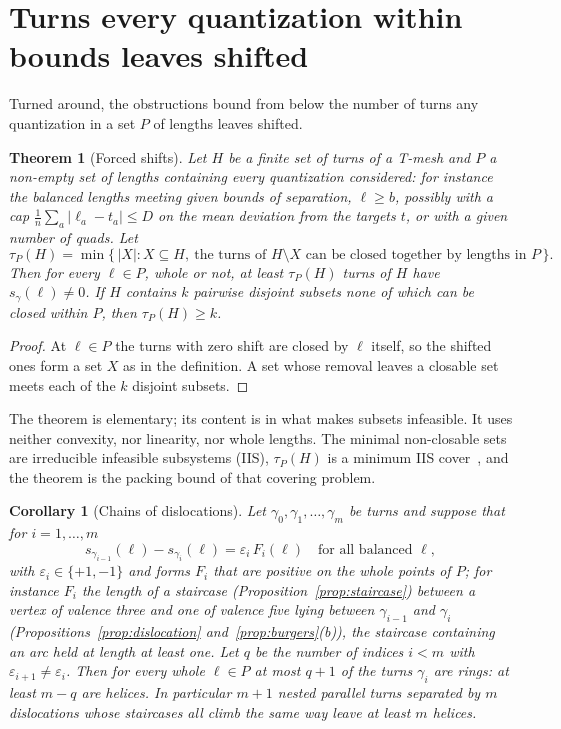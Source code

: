 \documentclass[11pt,a4paper]{article}
\newtheorem{theorem}{Theorem}
\newtheorem{corollary}{Corollary}
\newcommand{\shift}{s}
\begin{document}
\section{Turns every quantization within bounds leaves shifted}\label{sec:forced}

Turned around, the obstructions bound from below the number of turns any
quantization in a set $P$ of lengths leaves shifted.

\begin{theorem}[Forced shifts]\label{thm:forced}
Let $H$ be a finite set of turns of a T-mesh and $P$ a non-empty set of lengths
containing every quantization considered: for instance the balanced lengths
meeting given bounds of separation, $\ell \ge b$, possibly with a cap $\frac1n
\sum_a |\ell_a - t_a| \le D$ on the mean deviation from the targets $t$, or with
a given number of quads. Let
\[
  \tau_P(H) = \min\bigl\{\, |X| : X \subseteq H,\ \text{the turns of } H
  \setminus X \text{ can be closed together by lengths in } P \,\bigr\}.
\]
Then for every $\ell \in P$, whole or not, at least $\tau_P(H)$ turns of $H$
have $\shift_\gamma(\ell) \neq 0$. If $H$ contains $k$ pairwise disjoint subsets
none of which can be closed within $P$, then $\tau_P(H) \ge k$.
\end{theorem}

\begin{proof}
At $\ell \in P$ the turns with zero shift are closed by $\ell$ itself, so the
shifted ones form a set $X$ as in the definition. A set whose removal leaves a
closable set meets each of the $k$ disjoint subsets.
\end{proof}

The theorem is elementary; its content is in what makes subsets infeasible.
It uses neither convexity, nor linearity, nor whole lengths. The minimal
non-closable sets are irreducible infeasible subsystems (IIS), $\tau_P(H)$ is
a minimum IIS cover~\cite{parker1996iis,amaldi2003maxfs}, and the theorem is
the packing bound of that covering problem.

\begin{corollary}[Chains of dislocations]\label{cor:chain}
Let $\gamma_0, \gamma_1, \dots, \gamma_m$ be turns and suppose that for $i = 1,
\dots, m$
\[
  \shift_{\gamma_{i-1}}(\ell) - \shift_{\gamma_i}(\ell) = \varepsilon_i\,
  F_i(\ell) \quad \text{for all balanced } \ell,
\]
with $\varepsilon_i \in \{+1, -1\}$ and forms $F_i$ that are positive on the
whole points of $P$; for instance $F_i$ the length of a staircase
(Proposition~\ref{prop:staircase}) between a vertex of valence three and one of
valence five lying between $\gamma_{i-1}$ and $\gamma_i$
(Propositions~\ref{prop:dislocation} and~\ref{prop:burgers}(b)), the
staircase containing an arc held at length at least one. Let $q$ be the number
of indices $i < m$ with $\varepsilon_{i+1} \neq \varepsilon_i$. Then for every
whole $\ell \in P$ at most $q + 1$ of the turns $\gamma_i$ are rings: at least
$m - q$ are helices. In particular $m + 1$ nested parallel turns separated by
$m$ dislocations whose staircases all climb the same way leave at least $m$
helices.
\end{corollary}
\end{document}
